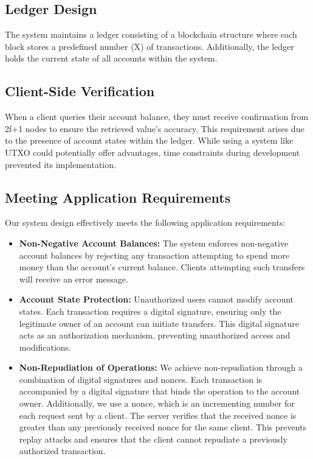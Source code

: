 \subsection{Ledger Design}
The system maintains a ledger consisting of a blockchain structure where each block stores a predefined number (X) of transactions. Additionally, the ledger holds the current state of all accounts within the system.

\subsection{Client-Side Verification}
When a client queries their account balance, they must receive confirmation from 2f+1 nodes to ensure the retrieved value's accuracy. This requirement arises due to the presence of account states within the ledger. While using a system like UTXO could potentially offer advantages, time constraints during development prevented its implementation.

\subsection{Meeting Application Requirements}

Our system design effectively meets the following application requirements:

\begin{itemize}
\item \textbf{Non-Negative Account Balances:} The system enforces non-negative account balances by rejecting any transaction attempting to spend more money than the account's current balance. Clients attempting such transfers will receive an error message.

\item \textbf{Account State Protection:} Unauthorized users cannot modify account states. Each transaction requires a digital signature, ensuring only the legitimate owner of an account can initiate transfers. This digital signature acts as an authorization mechanism, preventing unauthorized access and modifications.

\item \textbf{Non-Repudiation of Operations:} We achieve non-repudiation through a combination of digital signatures and nonces. Each transaction is accompanied by a digital signature that binds the operation to the account owner. Additionally, we use a nonce, which is an incrementing number for each request sent by a client. The server verifies that the received nonce is greater than any previously received nonce for the same client. This prevents replay attacks and ensures that the client cannot repudiate a previously authorized transaction.
\end{itemize}

